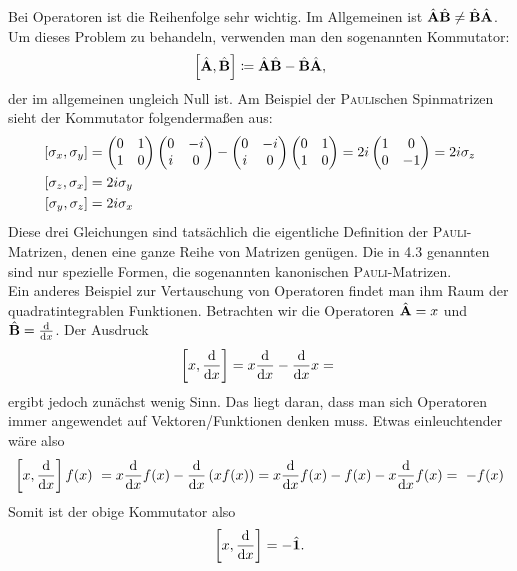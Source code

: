 \documentclass[a4paper,12pt,portrait]{book}
\numberwithin{equation}{section}
\begin{document}
Bei Operatoren ist die Reihenfolge sehr wichtig. Im Allgemeinen ist 
$\hat{\textbf{A}}\hat{\textbf{B}} \neq \hat{\textbf{B}}\hat{\textbf{A}}$. Um dieses Problem zu behandeln, verwenden man den sogenannten Kommutator:
\begin{equation*}
\left[ \hat{\textbf{A}} , \hat{\textbf{B}} \right]\coloneqq\hat{\textbf{A}}\hat{\textbf{B}}-\hat{\textbf{B}}\hat{\textbf{A}},
\end{equation*}
der im allgemeinen ungleich Null ist. Am Beispiel der \textsc{Pauli}schen Spinmatrizen sieht der Kommutator folgendermaßen aus:
\begin{align*}
\left[ \sigma_x , \sigma_y \right] &= 
\begin{pmatrix} 0 & 1 \\ 1 & 0 \end{pmatrix}
\begin{pmatrix} 0 & -i \\ i & 0\end{pmatrix} - 
\begin{pmatrix} 0 & -i \\ i & 0\end{pmatrix} 
\begin{pmatrix} 0 & 1 \\ 1 & 0 \end{pmatrix}  =
2i\begin{pmatrix}1 & 0 \\ 0 & -1 \end{pmatrix} = 
2i\sigma_z	\\
\left[ \sigma_z , \sigma_x \right] & = 2i\sigma_y\\
\left[ \sigma_y , \sigma_z \right] & = 2i\sigma_x
\end{align*} 
Diese drei Gleichungen sind tatsächlich die eigentliche Definition der \textsc{Pauli}-Matrizen, denen eine ganze Reihe von Matrizen genügen. Die in 4.3 genannten sind nur spezielle Formen, die sogenannten kanonischen \textsc{Pauli}-Matrizen. \\

Ein anderes Beispiel zur Vertauschung von Operatoren findet man ihm Raum der quadratintegrablen Funktionen.  Betrachten wir die Operatoren $\hat{\textbf{A}}=x$ und $\hat{\textbf{B}}=\frac{\mathrm{d}{}}{\mathrm{d}{x}}$. Der Ausdruck
\begin{equation*}
\left[ x , \frac{\mathrm{d}{}}{\mathrm{d}{x}} \right] = x\frac{\mathrm{d}{}}{\mathrm{d}{x}}-\frac{\mathrm{d}{}}{\mathrm{d}{x}}x = \ 
\end{equation*}
ergibt jedoch zunächst wenig Sinn. Das liegt daran, dass man sich Operatoren immer angewendet auf Vektoren/Funktionen denken muss. Etwas einleuchtender wäre also
\begin{equation*}
\commutator{x}{\diff{}{x}}f(x)\ =x\diff{}{x}f(x)-\diff{}{x}\left(xf(x)\right) = x\diff{}{x}f(x) - f(x) - x\diff{}{x}f(x) = \ -f(x)
\end{equation*}
Somit ist der obige Kommutator also
\begin{equation*}
\left[ x , \frac{\mathrm{d}{}}{\mathrm{d}{x}} \right] = -\hat{\textbf{1}}.
\end{equation*}
\end{document}
